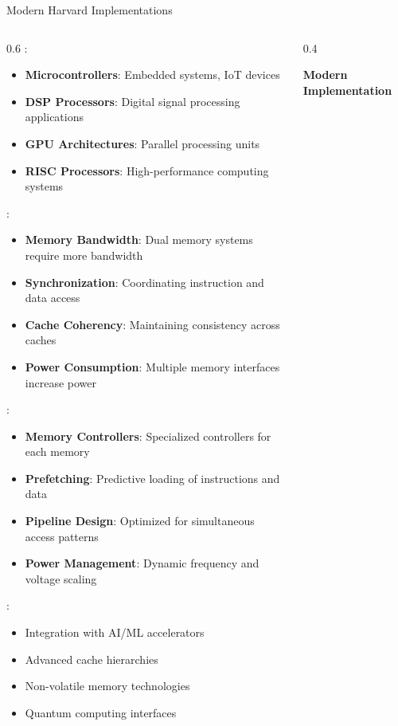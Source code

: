 \begin{frame}{Modern Harvard Implementations}
\begin{columns}
\begin{column}{0.6\textwidth}
:
\begin{itemize}
\item \textbf{Microcontrollers}: Embedded systems, IoT devices
\item \textbf{DSP Processors}: Digital signal processing applications
\item \textbf{GPU Architectures}: Parallel processing units
\item \textbf{RISC Processors}: High-performance computing systems
\end{itemize}

\vspace{0.3cm}
:
\begin{itemize}
\item \textbf{Memory Bandwidth}: Dual memory systems require more bandwidth
\item \textbf{Synchronization}: Coordinating instruction and data access
\item \textbf{Cache Coherency}: Maintaining consistency across caches
\item \textbf{Power Consumption}: Multiple memory interfaces increase power
\end{itemize}

\vspace{0.3cm}
:
\begin{itemize}
\item \textbf{Memory Controllers}: Specialized controllers for each memory
\item \textbf{Prefetching}: Predictive loading of instructions and data
\item \textbf{Pipeline Design}: Optimized for simultaneous access patterns
\item \textbf{Power Management}: Dynamic frequency and voltage scaling
\end{itemize}

\vspace{0.3cm}
:
\begin{itemize}
\item Integration with AI/ML accelerators
\item Advanced cache hierarchies
\item Non-volatile memory technologies
\item Quantum computing interfaces
\end{itemize}
\end{column}
\begin{column}{0.4\textwidth}
\begin{center}
\textbf{Modern Implementation}
\vspace{0.3cm}


\end{center}
\end{column}
\end{columns}
\end{frame}

